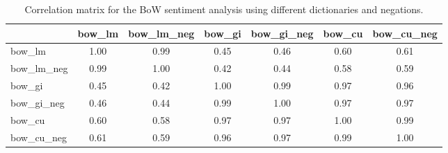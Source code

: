 \begin{table}
\caption{Correlation matrix for the BoW sentiment analysis using different dictionaries and negations.}
\label{tab:bow_sentiment_correlations}
\begin{tabular}{lcccccc}
\toprule
 & bow_lm & bow_lm_neg & bow_gi & bow_gi_neg & bow_cu & bow_cu_neg \\
\midrule
bow_lm & 1.00 & 0.99 & 0.45 & 0.46 & 0.60 & 0.61 \\
bow_lm_neg & 0.99 & 1.00 & 0.42 & 0.44 & 0.58 & 0.59 \\
bow_gi & 0.45 & 0.42 & 1.00 & 0.99 & 0.97 & 0.96 \\
bow_gi_neg & 0.46 & 0.44 & 0.99 & 1.00 & 0.97 & 0.97 \\
bow_cu & 0.60 & 0.58 & 0.97 & 0.97 & 1.00 & 0.99 \\
bow_cu_neg & 0.61 & 0.59 & 0.96 & 0.97 & 0.99 & 1.00 \\
\bottomrule
\end{tabular}
\end{table}
